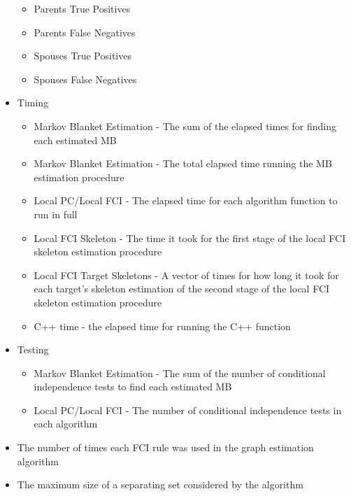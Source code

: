 \documentclass[12pt]{article}\usepackage[]{graphicx}\usepackage[]{color}
\begin{document}
\begin{itemize}
\begin{itemize}
\item Parents True Positives
\item Parents False Negatives
\item Spouses True Positives
\item Spouses False Negatives
\end{itemize}
\item Timing
\begin{itemize}
\item Markov Blanket Estimation - The sum of the elapsed times for finding each estimated MB
\item Markov Blanket Estimation - The total elapsed time running the MB estimation procedure
\item Local PC/Local FCI - The elapsed time for each algorithm function to run in full
\item Local FCI Skeleton - The time it took for the first stage of the local FCI skeleton estimation procedure
\item Local FCI Target Skeletons - A vector of times for how long it took for each target's skeleton estimation of the second stage of the local FCI skeleton estimation procedure
\item C++ time - the elapsed time for running the C++ function
\end{itemize}
\item Testing
\begin{itemize}
\item Markov Blanket Estimation - The sum of the number of conditional independence tests to find each estimated MB
\item Local PC/Local FCI - The number of conditional independence tests in each algorithm
\end{itemize}
\item The number of times each FCI rule was used in the graph estimation algorithm
\item The maximum size of a separating set considered by the algorithm
\end{itemize}
\end{document}
